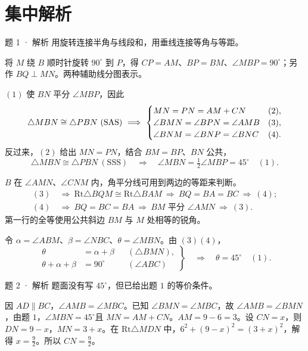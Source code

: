 \section{集中解析}

\begin{solution}{题 1 · 解析}
\think 用旋转连接半角与线段和，用垂线连接等角与等距。
\diagram{\figTwoEquivalence}

\solve 将 \(M\) 绕 \(B\) 顺时针旋转 \(90^\circ\) 到 \(P\)，得 \(CP=AM\)、\(BP=BM\)、\(\angle MBP=90^\circ\)；另作 \(BQ\perp MN\)。两种辅助线分图表示。
\diagram{\figTwoSolve}

\((1)\) 使 \(BN\) 平分 \(\angle MBP\)，因此
\[
\triangle MBN\cong\triangle PBN\ (\mathrm{SAS})
\ \Longrightarrow\ \relax
\begin{cases}
MN=PN=AM+CN &(2),\\
\angle BMN=\angle BPN=\angle AMB &(3),\\
\angle BNM=\angle BNP=\angle BNC &(4).
\end{cases}
\]
反过来，\((2)\) 给出 \(MN=PN\)，结合 \(BM=BP\)、\(BN\) 公共，
\[
\triangle MBN\cong\triangle PBN\ (\mathrm{SSS})
\quad\Longrightarrow\quad
\angle MBN=\tfrac12\angle MBP=45^\circ\quad(1).
\]

\(B\) 在 \(\angle AMN\)、\(\angle CNM\) 内，角平分线可用到两边的等距来判断。
\[
\begin{aligned}
(3)&\ \Longrightarrow\ \mathrm{Rt}\triangle BQM\cong\mathrm{Rt}\triangle BAM
\ \Longrightarrow\ BQ=BA=BC\ \Longrightarrow\ (4);\\
(4)&\ \Longrightarrow\ BQ=BC=BA
\ \Longrightarrow\ BM\text{ 平分 }\angle AMN\ \Longrightarrow\ (3).
\end{aligned}
\]
第一行的全等使用公共斜边 \(BM\) 与 \(M\) 处相等的锐角。

令 \(\alpha=\angle ABM\)、\(\beta=\angle NBC\)、\(\theta=\angle MBN\)。由 \((3)(4)\)，
\[
\left.\begin{aligned}
\theta&=\alpha+\beta &&(\triangle BMN),\\
\theta+\alpha+\beta&=90^\circ &&(\angle ABC)
\end{aligned}\right\}
\quad\Longrightarrow\quad \theta=45^\circ\quad(1).
\]
\end{solution}
\begin{solution}{题 2 · 解析}
\think 题面没有写 \(45^\circ \)，但已给出题 \(1\) 的等价条件。

\solve 因 \(AD\parallel BC\)，\(\angle AMB=\angle MBC\)。已知 \(\angle BMN=\angle MBC\)，故 \(\angle AMB=\angle BMN\)，由题 \(1\)，\(\angle MBN=45^\circ \)且 \(MN=AM+CN\)。\(AM=9-6=3\)。设 \(CN=x\)，则 \(DN=9-x\)，\(MN=3+x\)。在 \(\mathrm{Rt}\triangle MDN\) 中，\(6^2+(9-x)^2=(3+x)^2\)，解得 \(x=\frac{9}{2}\)。所以 \(CN=\frac{9}{2}\)。

\end{solution}
